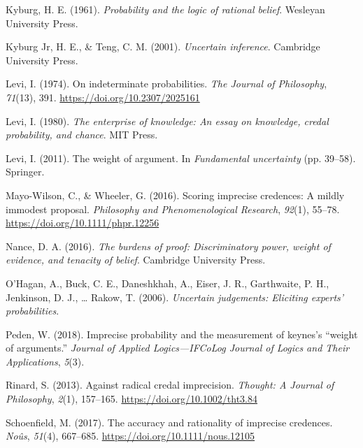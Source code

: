 \documentclass[
  10pt,
  dvipsnames,enabledeprecatedfontcommands]{scrartcl}
\newlength{\cslhangindent}
\newlength{\cslentryspacingunit} %
\newenvironment{CSLReferences}[2] %
 {%
  \setlength{\parindent}{0pt}
  \ifodd #1
  \let\oldpar\par
  \def\par{\hangindent=\cslhangindent\oldpar}
  \fi
  \setlength{\parskip}{#2\cslentryspacingunit}
 }%
 {}
\begin{document}
\begin{CSLReferences}{1}{0}
\leavevmode{}%
Kyburg, H. E. (1961). \emph{Probability and the logic of rational
belief}. Wesleyan University Press.

\leavevmode{}%
Kyburg Jr, H. E., \& Teng, C. M. (2001). \emph{Uncertain inference}.
Cambridge University Press.

\leavevmode{}%
Levi, I. (1974). On indeterminate probabilities. \emph{The Journal of
Philosophy}, \emph{71}(13), 391. \url{https://doi.org/10.2307/2025161}

\leavevmode{}%
Levi, I. (1980). \emph{The enterprise of knowledge: An essay on
knowledge, credal probability, and chance}. MIT Press.

\leavevmode{}%
Levi, I. (2011). The weight of argument. In \emph{Fundamental
uncertainty} (pp. 39--58). Springer.

\leavevmode{}%
Mayo-Wilson, C., \& Wheeler, G. (2016). Scoring imprecise credences: A
mildly immodest proposal. \emph{Philosophy and Phenomenological
Research}, \emph{92}(1), 55--78.
\url{https://doi.org/10.1111/phpr.12256}

\leavevmode{}%
Nance, D. A. (2016). \emph{The burdens of proof: Discriminatory power,
weight of evidence, and tenacity of belief}. Cambridge University Press.

\leavevmode{}%
O'Hagan, A., Buck, C. E., Daneshkhah, A., Eiser, J. R., Garthwaite, P.
H., Jenkinson, D. J., \ldots{} Rakow, T. (2006). \emph{Uncertain
judgements: Eliciting experts' probabilities}.

\leavevmode{}%
Peden, W. (2018). Imprecise probability and the measurement of keynes's
{``weight of arguments.''} \emph{Journal of Applied Logics---IFCoLog
Journal of Logics and Their Applications}, \emph{5}(3).

\leavevmode{}%
Rinard, S. (2013). Against radical credal imprecision. \emph{Thought: A
Journal of Philosophy}, \emph{2}(1), 157--165.
\url{https://doi.org/10.1002/tht3.84}

\leavevmode{}%
Schoenfield, M. (2017). The accuracy and rationality of imprecise
credences. \emph{Noûs}, \emph{51}(4), 667--685.
\url{https://doi.org/10.1111/nous.12105}


\end{CSLReferences}
\end{document}
